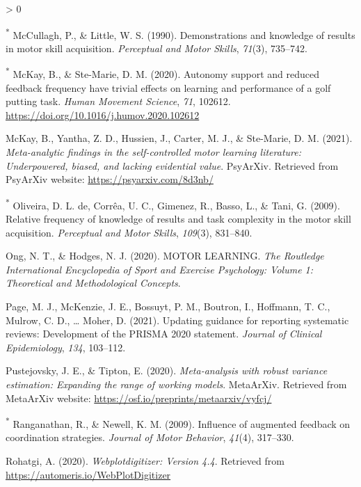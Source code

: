 \documentclass[
  english,
  man,mask,floatsintext]{apa7}
\newlength{\cslhangindent}
\newenvironment{CSLReferences}[2] %
 {%
  \setlength{\parindent}{0pt}
  \ifodd #1 \everypar{\setlength{\hangindent}{\cslhangindent}}\ignorespaces\fi
  \ifnum #2 > 0
  \setlength{\parskip}{#2\baselineskip}
  \fi
 }%
 {}
\begin{document}
\begin{CSLReferences}{1}{0}
\leavevmode\hypertarget{ref-McCullagh1990}{}%
\textsuperscript{*} McCullagh, P., \& Little, W. S. (1990). Demonstrations and knowledge of results in motor skill acquisition. \emph{Perceptual and Motor Skills}, \emph{71}(3), 735--742.

\leavevmode\hypertarget{ref-McKay2020}{}%
\textsuperscript{*} McKay, B., \& Ste-Marie, D. M. (2020). Autonomy support and reduced feedback frequency have trivial effects on learning and performance of a golf putting task. \emph{Human Movement Science}, \emph{71}, 102612. \url{https://doi.org/10.1016/j.humov.2020.102612}

\leavevmode\hypertarget{ref-McKay2021}{}%
McKay, B., Yantha, Z. D., Hussien, J., Carter, M. J., \& Ste-Marie, D. M. (2021). \emph{Meta-analytic findings in the self-controlled motor learning literature: Underpowered, biased, and lacking evidential value}. PsyArXiv. Retrieved from PsyArXiv website: \url{https://psyarxiv.com/8d3nb/}

\leavevmode\hypertarget{ref-Oliveira2009}{}%
\textsuperscript{*} Oliveira, D. L. de, Corrêa, U. C., Gimenez, R., Basso, L., \& Tani, G. (2009). Relative frequency of knowledge of results and task complexity in the motor skill acquisition. \emph{Perceptual and Motor Skills}, \emph{109}(3), 831--840.

\leavevmode\hypertarget{ref-Ong2020}{}%
Ong, N. T., \& Hodges, N. J. (2020). MOTOR LEARNING. \emph{The Routledge International Encyclopedia of Sport and Exercise Psychology: Volume 1: Theoretical and Methodological Concepts}.

\leavevmode\hypertarget{ref-Page2021}{}%
Page, M. J., McKenzie, J. E., Bossuyt, P. M., Boutron, I., Hoffmann, T. C., Mulrow, C. D., \ldots{} Moher, D. (2021). Updating guidance for reporting systematic reviews: Development of the PRISMA 2020 statement. \emph{Journal of Clinical Epidemiology}, \emph{134}, 103--112.

\leavevmode\hypertarget{ref-Pustejovsky2020}{}%
Pustejovsky, J. E., \& Tipton, E. (2020). \emph{Meta-analysis with robust variance estimation: Expanding the range of working models}. MetaArXiv. Retrieved from MetaArXiv website: \url{https://osf.io/preprints/metaarxiv/vyfcj/}

\leavevmode\hypertarget{ref-Ranganathan2009}{}%
\textsuperscript{*} Ranganathan, R., \& Newell, K. M. (2009). Influence of augmented feedback on coordination strategies. \emph{Journal of Motor Behavior}, \emph{41}(4), 317--330.

\leavevmode\hypertarget{ref-Rohatgi2020}{}%
Rohatgi, A. (2020). \emph{Webplotdigitizer: Version 4.4}. Retrieved from \url{https://automeris.io/WebPlotDigitizer}


\end{CSLReferences}
\end{document}
